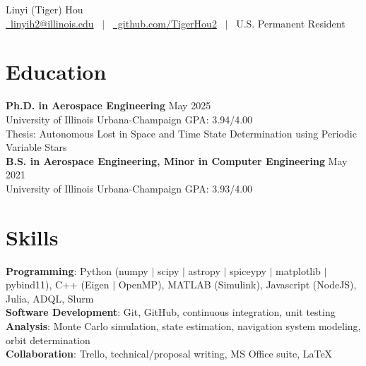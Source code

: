 \documentclass[letterpaper,11pt]{article}
\begin{document}
	
	\thispagestyle{firstpage}
	\vspace*{-53pt}
	
	
	\begin{center}
		{\Huge Linyi (Tiger) Hou} \\[7.5pt]
		\href{mailto:linyih2@illinois.edu}{\raisebox{-0.05\height}\faEnvelope \ linyih2@illinois.edu}
		\ $|$ \ \href{https://github.com/TigerHou2}{\raisebox{-0.05\height}\faGithub \ github.com/TigerHou2} 
		\ $|$ \ U.S. Permanent Resident \\
	\end{center}
	


	\section{Education}
	\textbf{Ph.D. in Aerospace Engineering} \hfill May 2025 \\
	University of Illinois Urbana-Champaign \hfill GPA: 3.94/4.00 \\
	Thesis: Autonomous Lost in Space and Time State Determination using Periodic Variable Stars \\[3.75pt]
	\textbf{B.S. in Aerospace Engineering, Minor in Computer Engineering} \hfill May 2021 \\
	University of Illinois Urbana-Champaign \hfill GPA: 3.93/4.00
	
	

	\section{Skills}
	\textbf{Programming}: Python (numpy $|$ scipy $|$ astropy $|$ spiceypy $|$ matplotlib $|$ pybind11), C++ (Eigen $|$ OpenMP), MATLAB (Simulink), Javascript (NodeJS), Julia, ADQL, Slurm \\[3.75pt]
	\textbf{Software Development}: Git, GitHub, continuous integration, unit testing \\[3.75pt]
	\textbf{Analysis}: Monte Carlo simulation, state estimation, navigation system modeling, orbit determination \\[3.75pt]
	\textbf{Collaboration}: Trello, technical/proposal writing, MS Office suite, \LaTeX
	
\end{document}
